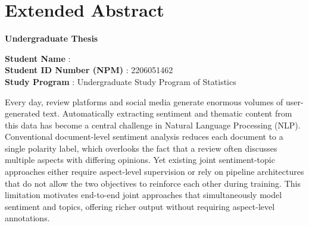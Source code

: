 \chapter*{Extended Abstract}

\renewcommand{\thetable}{\arabic{table}}
\renewcommand{\thefigure}{\arabic{figure}}
\setcounter{figure}{0}
\setcounter{table}{0}

\vspace*{-1cm}
{
\setlength{\parindent}{1.5em}

\begin{center}

{\normalsize\textbf{Undergraduate Thesis}}

\medskip
{\normalsize\textbf{\textit{\judulInggris}}}

\medskip
\textbf{Student Name} : \penulis \\
\textbf{Student ID Number (NPM)} : 2206051462 \\
\textbf{Study Program} : Undergraduate Study Program of Statistics
\end{center}

\bigskip

Every day, review platforms and social media generate enormous volumes of
user-generated text. Automatically extracting sentiment and thematic content
from this data has become a central challenge in Natural Language Processing
(NLP). Conventional document-level sentiment analysis reduces each document
to a single polarity label, which overlooks the fact that a review often
discusses multiple aspects with differing opinions. Yet existing joint
sentiment-topic approaches either require aspect-level supervision or rely
on pipeline architectures that do not allow the two objectives to reinforce
each other during training. This limitation motivates end-to-end joint
approaches that simultaneously model sentiment and topics, offering richer
output without requiring aspect-level annotations.

}
